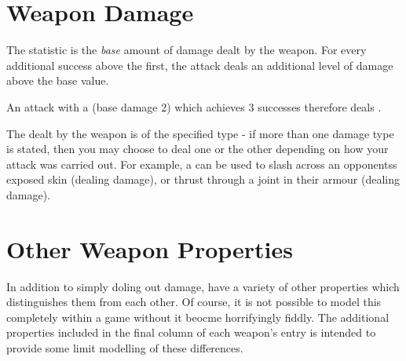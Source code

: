 \section{Weapon Damage}

The  statistic is the {\it base} amount of damage dealt by the weapon. For every additional success above the first, the attack deals an additional level of damage above the base value.

An attack with a  (base damage 2) which achieves 3 successes therefore deals .   

The  dealt by the weapon is of the specified type - if more than one damage type is stated, then you may choose to deal one or the other depending on how your attack was carried out. For example, a  can be used to slash across an opponentss exposed skin (dealing  damage), or thrust through a joint in their armour (dealing  damage). 

\section{Other Weapon Properties}

In addition to simply doling out damage,  have a variety of other properties which distinguishes them from each other. Of course, it is not possible to model this completely within a game without it beocme horrifyingly fiddly. The additional properties included in the final column of each weapon's entry is intended to provide some limit modelling of these differences. 

